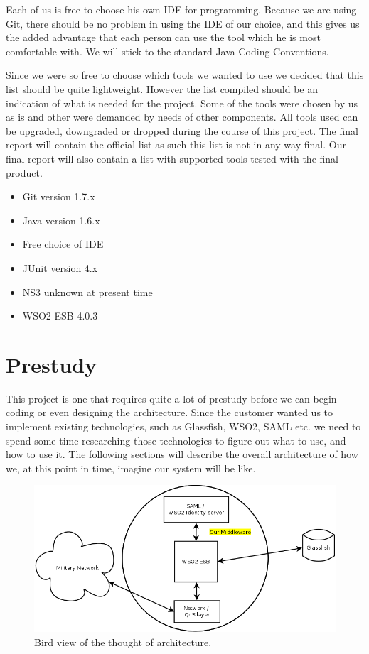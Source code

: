 \documentclass[12pt]{article}
\begin{document}
    Each of us is free to choose his own IDE for programming. Because we are using Git, there should be no problem in using the IDE of our choice, and this gives us the added advantage that each person can use the tool which he is most comfortable with. We will stick to the standard Java Coding Conventions.
    
    Since we were so free to choose which tools we wanted to use we decided that this list should be quite lightweight. However the list compiled should be an indication of what is needed for the project. Some of the tools were chosen by us as is and other were demanded by needs of other components. All tools used can be  upgraded, downgraded or dropped during the course of this project. The final report will contain the official list as such this list is not in any way final. Our final report will also contain a list with supported tools tested with the final product.
    \begin{itemize}
        \item Git version 1.7.x
        \item Java version 1.6.x
        \item Free choice of IDE
        \item JUnit version 4.x
        \item NS3 unknown at present time
        \item WSO2 ESB 4.0.3
    \end{itemize}
    
\section{Prestudy}\label{prestudy} This project is one that requires quite a lot of prestudy before we can begin coding or even designing the architecture. Since the customer wanted us to implement existing technologies, such as Glassfish, WSO2, SAML etc. we need to spend some time researching those technologies to figure out what to use, and how to use it. The following sections will describe the overall architecture of how we, at this point in time, imagine our system will be like. 

        \begin{figure}[htb]
            \centering
            \includegraphics[scale=0.3]{birdarch}
            \caption{Bird view of the thought of architecture.}
            \label{fig:birdarch}
        \end{figure}
\end{document}
